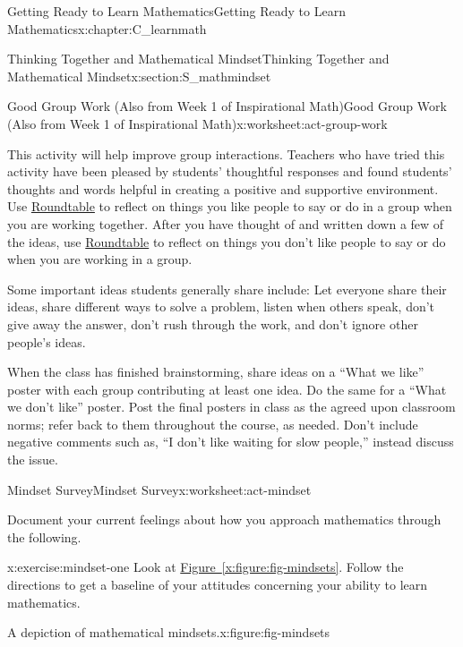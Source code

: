 \documentclass[oneside,10pt,]{book}
\newcommand{\xreffont}{\relax}
\numberwithin{equation}{chapter}
\begin{document}
\begin{chapterptx}{Getting Ready to Learn Mathematics}{}{Getting Ready to Learn Mathematics}{}{}{x:chapter:C_learnmath}
\begin{sectionptx}{Thinking Together and Mathematical Mindset}{}{Thinking Together and Mathematical Mindset}{}{}{x:section:S_mathmindset}
\begin{worksheet-subsection}{Good Group Work (Also from Week 1 of Inspirational Math)}{}{Good Group Work (Also from Week 1 of Inspirational Math)}{}{}{x:worksheet:act-group-work}
\par
This activity will help improve group interactions. Teachers who have tried this activity have been pleased by students' thoughtful responses and found students' thoughts and words helpful in creating a positive and supportive environment. Use \hyperlink{x:paragraphs:mindset-roundtable}{Roundtable} to reflect on things you like people to say or do in a group when you are working together. After you have thought of and written down a few of the ideas, use \hyperlink{x:paragraphs:mindset-roundtable}{Roundtable} to reflect on things you don't like people to say or do when you are working in a group.%
\par
Some important ideas students generally share include: Let everyone share their ideas, share different ways to solve a problem, listen when others speak, don't give away the answer, don't rush through the work, and don't ignore other people's ideas.%
\par
When the class has finished brainstorming, share ideas on a ``What we like'' poster with each group contributing at least one idea. Do the same for a ``What we don't like'' poster. Post the final posters in class as the agreed upon classroom norms; refer back to them throughout the course, as needed. Don't include negative comments such as, ``I don't like waiting for slow people,'' instead discuss the issue.%
\end{worksheet-subsection}
\restoregeometry
%
%
\typeout{************************************************}
\typeout{************************************************}
%
\begin{worksheet-subsection}{Mindset Survey}{}{Mindset Survey}{}{}{x:worksheet:act-mindset}
\begin{introduction}{}%
Document your current feelings about how you approach mathematics through the following.%
\end{introduction}%
\begin{divisionexercise}{1}{}{}{x:exercise:mindset-one}%
Look at \hyperref[x:figure:fig-mindsets]{Figure~{\xreffont\ref{x:figure:fig-mindsets}}}. Follow the directions to get a baseline of your attitudes concerning your ability to learn mathematics.%
\begin{figureptx}{A depiction of mathematical mindsets.}{x:figure:fig-mindsets}{}%
\begin{image}{0.25}{0.5}{0.25}%

\end{image}
\end{figureptx}
\end{divisionexercise}
\end{worksheet-subsection}
\end{sectionptx}
\end{chapterptx}
\end{document}

